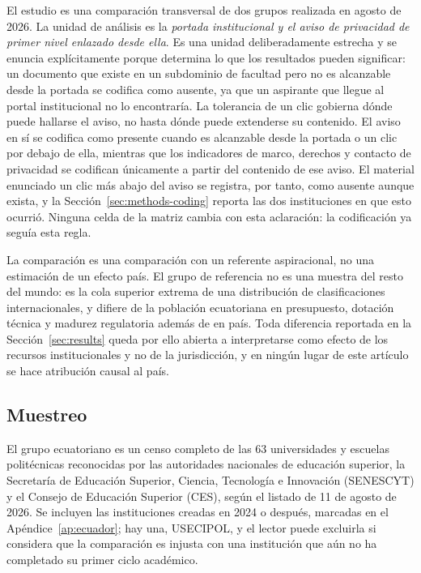 \documentclass[pdflatex,sn-basic,Numbered,iicol]{sn-jnl}
\theoremstyle{thmstyleone}
\theoremstyle{thmstyletwo}
\theoremstyle{thmstylethree}
\begin{document}
El estudio es una comparaci\'on transversal de dos grupos realizada en agosto de 2026. La unidad de an\'alisis es la \emph{portada institucional y el aviso de privacidad de primer nivel enlazado desde ella}. Es una unidad deliberadamente estrecha y se enuncia expl\'icitamente porque determina lo que los resultados pueden significar: un documento que existe en un subdominio de facultad pero no es alcanzable desde la portada se codifica como ausente, ya que un aspirante que llegue al portal institucional no lo encontrar\'ia. La tolerancia de un clic gobierna d\'onde puede hallarse el aviso, no hasta d\'onde puede extenderse su contenido. El aviso en s\'i se codifica como presente cuando es alcanzable desde la portada o un clic por debajo de ella, mientras que los indicadores de marco, derechos y contacto de privacidad se codifican \'unicamente a partir del contenido de ese aviso. El material enunciado un clic m\'as abajo del aviso se registra, por tanto, como ausente aunque exista, y la Secci\'on~\ref{sec:methods-coding} reporta las dos instituciones en que esto ocurri\'o. Ninguna celda de la matriz cambia con esta aclaraci\'on: la codificaci\'on ya segu\'ia esta regla.

La comparaci\'on es una comparaci\'on con un referente aspiracional, no una estimaci\'on de un efecto pa\'is. El grupo de referencia no es una muestra del \guillemotleft resto del mundo\guillemotright: es la cola superior extrema de una distribuci\'on de clasificaciones internacionales, y difiere de la poblaci\'on ecuatoriana en presupuesto, dotaci\'on t\'ecnica y madurez regulatoria adem\'as de en pa\'is. Toda diferencia reportada en la Secci\'on~\ref{sec:results} queda por ello abierta a interpretarse como efecto de los recursos institucionales y no de la jurisdicci\'on, y en ning\'un lugar de este art\'iculo se hace atribuci\'on causal al pa\'is.

\subsection{Muestreo}\label{sec:methods-sampling}

El grupo ecuatoriano es un censo completo de las 63 universidades y escuelas polit\'ecnicas reconocidas por las autoridades nacionales de educaci\'on superior, la Secretar\'ia de Educaci\'on Superior, Ciencia, Tecnolog\'ia e Innovaci\'on (SENESCYT) y el Consejo de Educaci\'on Superior (CES), seg\'un el listado de 11 de agosto de 2026. Se incluyen las instituciones creadas en 2024 o despu\'es, marcadas en el Ap\'endice~\ref{ap:ecuador}; hay una, USECIPOL, y el lector puede excluirla si considera que la comparaci\'on es injusta con una instituci\'on que a\'un no ha completado su primer ciclo acad\'emico.
\end{document}
